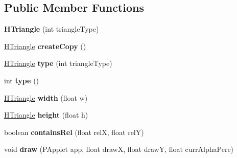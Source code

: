 \subsection*{Public Member Functions}
\begin{DoxyCompactItemize}
\item 
\hypertarget{classhype_1_1drawable_1_1_h_triangle_a0e5576354aaccf97051418b6da7a5a79}{{\bfseries H\-Triangle} (int triangle\-Type)}\label{classhype_1_1drawable_1_1_h_triangle_a0e5576354aaccf97051418b6da7a5a79}

\item 
\hypertarget{classhype_1_1drawable_1_1_h_triangle_ac763efc21e2afa736061d6c81cd17b01}{\hyperlink{classhype_1_1drawable_1_1_h_triangle}{H\-Triangle} {\bfseries create\-Copy} ()}\label{classhype_1_1drawable_1_1_h_triangle_ac763efc21e2afa736061d6c81cd17b01}

\item 
\hypertarget{classhype_1_1drawable_1_1_h_triangle_a86711aba96084441555366d8c6a9f2ea}{\hyperlink{classhype_1_1drawable_1_1_h_triangle}{H\-Triangle} {\bfseries type} (int triangle\-Type)}\label{classhype_1_1drawable_1_1_h_triangle_a86711aba96084441555366d8c6a9f2ea}

\item 
\hypertarget{classhype_1_1drawable_1_1_h_triangle_a03240695901d571ff13d807fe19107c6}{int {\bfseries type} ()}\label{classhype_1_1drawable_1_1_h_triangle_a03240695901d571ff13d807fe19107c6}

\item 
\hypertarget{classhype_1_1drawable_1_1_h_triangle_a68b40ad4eab9703328d766adbf88f1ee}{\hyperlink{classhype_1_1drawable_1_1_h_triangle}{H\-Triangle} {\bfseries width} (float w)}\label{classhype_1_1drawable_1_1_h_triangle_a68b40ad4eab9703328d766adbf88f1ee}

\item 
\hypertarget{classhype_1_1drawable_1_1_h_triangle_adafd6c5d5c2420f4bbce6a61f291b22f}{\hyperlink{classhype_1_1drawable_1_1_h_triangle}{H\-Triangle} {\bfseries height} (float h)}\label{classhype_1_1drawable_1_1_h_triangle_adafd6c5d5c2420f4bbce6a61f291b22f}

\item 
\hypertarget{classhype_1_1drawable_1_1_h_triangle_ad0e27196dc649e4533d3a6ea5a2cc05d}{boolean {\bfseries contains\-Rel} (float rel\-X, float rel\-Y)}\label{classhype_1_1drawable_1_1_h_triangle_ad0e27196dc649e4533d3a6ea5a2cc05d}

\item 
\hypertarget{classhype_1_1drawable_1_1_h_triangle_a0f334c5c07aef482ae39964e36642552}{void {\bfseries draw} (P\-Applet app, float draw\-X, float draw\-Y, float curr\-Alpha\-Perc)}\label{classhype_1_1drawable_1_1_h_triangle_a0f334c5c07aef482ae39964e36642552}

\end{DoxyCompactItemize}
